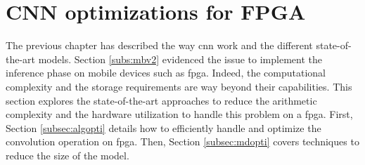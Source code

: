 \section{CNN optimizations for FPGA} \label{sec:opti_cnn}
%
%
The previous chapter has described the way \acrshort{cnn} work and the different state-of-the-art models. Section \ref{subs:mbv2} evidenced the issue to implement the inference phase on mobile devices such as \acrshort{fpga}. Indeed, the computational complexity and the storage requirements are way beyond their capabilities. This section explores the state-of-the-art approaches to reduce the arithmetic complexity and the hardware utilization to handle this problem on a \acrshort{fpga}. First, Section \ref{subsec:algopti} details how to efficiently handle and optimize the convolution operation on \acrshort{fpga}. Then, Section \ref{subsec:mdopti} covers techniques to reduce the size of the model.
%

%

